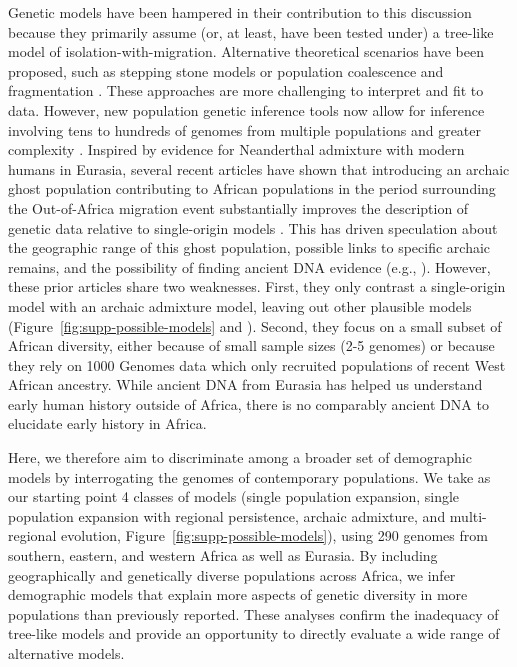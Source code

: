 \documentclass[]{article}
\begin{document}
Genetic models have been hampered in their contribution to this discussion
because they primarily assume (or, at least, have been tested under) a
tree-like model of isolation-with-migration. Alternative theoretical scenarios
have been proposed, such as stepping stone models \citep{Arredondo2021-qa} or
population coalescence and fragmentation \citep{Scerri2019-xg}. These
approaches are more challenging to interpret and fit to data. However, new
population genetic inference tools now allow for inference involving tens to
hundreds of genomes from multiple populations and greater complexity
\citep{Kamm2020-vn,Ragsdale2019-nt,Speidel2019-nj}. Inspired by evidence for
Neanderthal admixture with modern humans in Eurasia, several recent articles
have shown that introducing an archaic ghost population contributing to African
populations in the period surrounding the Out-of-Africa migration event
substantially improves the description of genetic data relative to
single-origin models
\citep{Plagnol2006-lt,Hammer2011-bx,Hsieh2016-gk,Hey2018-pw,Ragsdale2019-nt,Durvasula2020-td,Lorente-Galdos2019-vz,Durvasula2020-td}.
This has driven speculation about the geographic range of this ghost
population, possible links to specific archaic remains, and the possibility of
finding ancient DNA evidence (e.g., \citet{Hsieh2016-gk}). However, these prior
articles share two weaknesses. First, they only contrast a single-origin model
with an archaic admixture model, leaving out other plausible models
(Figure~\ref{fig:supp-possible-models} and \citet{Henn2018-rf}). Second, they
focus on a small subset of African diversity, either because of small sample
sizes (2-5 genomes) or because they rely on 1000 Genomes data which only
recruited populations of recent West African ancestry. While ancient DNA from
Eurasia has helped us understand early human history outside of Africa, there
is no comparably ancient DNA to elucidate early history in Africa.

Here, we therefore aim to discriminate among a broader set of demographic
models by interrogating the genomes of contemporary populations. We take as our
starting point 4 classes of models (single population expansion, single
    population expansion with regional persistence, archaic admixture, and
multi-regional evolution, Figure~\ref{fig:supp-possible-models}), using 290
genomes from southern, eastern, and western Africa as well as Eurasia. By
including geographically and genetically diverse populations across Africa, we
infer demographic models that explain more aspects of genetic diversity in more
populations than previously reported. These analyses confirm the inadequacy of
tree-like models and provide an opportunity to directly evaluate a wide range
of alternative models.
\end{document}
